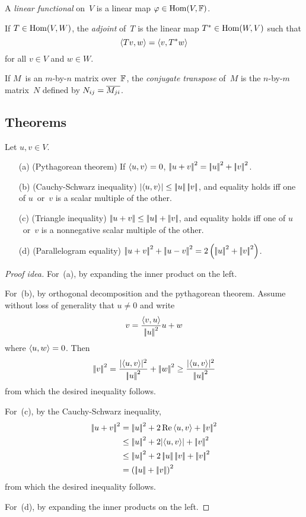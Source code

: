 \begin{defn}
A \emph{linear functional} on~\(V\) is a linear map \(\varphi\in\operatorname{Hom}(V,\mathbb{F})\).
\end{defn}

\begin{defn}
If \(T\in\operatorname{Hom}(V,W)\), the \emph{adjoint} of~\(T\) is the linear map \(T^*\in\operatorname{Hom}(W,V)\) such that
\[\langle{Tv},{w}\rangle=\langle{v},{T^*w}\rangle\]
for all \(v\in V\) and \(w\in W\).
\end{defn}

\begin{defn}
If \(M\)~is an \(m\)-by-\(n\) matrix over~\(\mathbb{F}\), the \emph{conjugate transpose} of~\(M\) is the \(n\)-by-\(m\) matrix~\(N\) defined by \(N_{ij}=\overline{M_{ji}}\).
\end{defn}

\subsection*{Theorems}
\begin{thm}[Geometry]
Let \(u,v\in V\).
\begin{enumerate}[itemsep=0pt]
\item[(a)] (Pythagorean theorem) If \(\langle{u},{v}\rangle=0\), \(\left|\!\left|{u+v}\right|\!\right|^2=\left|\!\left|{u}\right|\!\right|^2+\left|\!\left|{v}\right|\!\right|^2\).
\item[(b)] (Cauchy-Schwarz inequality) \(|{\langle{u},{v}\rangle}|\le\left|\!\left|{u}\right|\!\right|\left|\!\left|{v}\right|\!\right|\), and equality holds iff one of \(u\)~or~\(v\) is a scalar multiple of the other.
\item[(c)] (Triangle inequality) \(\left|\!\left|{u+v}\right|\!\right|\le\left|\!\left|{u}\right|\!\right|+\left|\!\left|{v}\right|\!\right|\), and equality holds iff one of \(u\)~or~\(v\) is a nonnegative scalar multiple of the other.
\item[(d)] (Parallelogram equality) \(\norm{u+v}^2+\norm{u-v}^2=2\left(\norm{u}^2+\norm{v}^2\right)\).
\end{enumerate}
\end{thm}
\begin{proof}[Proof idea]
For~(a), by expanding the inner product on the left.

For~(b), by orthogonal decomposition and the pythagorean theorem. Assume without loss of generality that \(u\ne0\) and write
\[v=\frac{\langle{v},{u}\rangle}{\left|\!\left|{u}\right|\!\right|^2}u+w\]
where \(\langle{u},{w}\rangle=0\). Then
\[\norm{v}^2=\frac{\abs{\innerprod{u}{v}}^2}{\norm{u}^2}+\norm{w}^2\ge\frac{\abs{\innerprod{u}{v}}^2}{\norm{u}^2}\]
from which the desired inequality follows.

For~(c), by the Cauchy-Schwarz inequality,
\begin{align*}
\norm{u+v}^2&=\norm{u}^2+2\Re{\innerprod{u}{v}}+\norm{v}^2\\
	&\le\norm{u}^2+2\abs{\innerprod{u}{v}}+\norm{v}^2\\
	&\le\norm{u}^2+2\norm{u}\norm{v}+\norm{v}^2\\
	&=\left(\norm{u}+\norm{v}\right)^2
\end{align*}
from which the desired inequality follows.

For~(d), by expanding the inner products on the left.
\end{proof}

